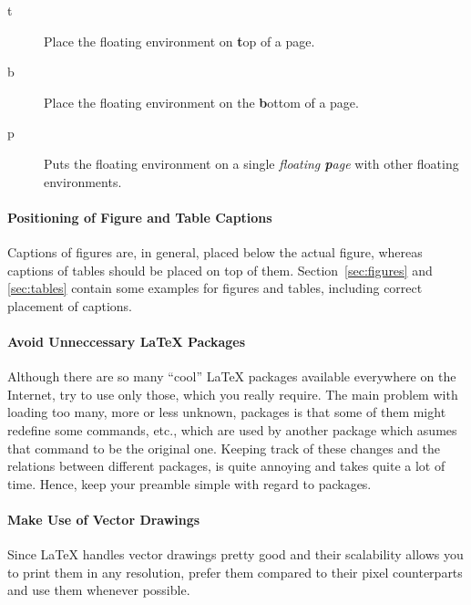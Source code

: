 \begin{description}
\item[t] Place the floating environment on \textbf{t}op of a page.
\item[b] Place the floating environment on the \textbf{b}ottom of a
  page.
\item[p] Puts the floating environment on a single \textit{floating
    \textbf{p}age} with other floating environments.
\end{description}


\paragraph{Positioning of Figure and Table Captions}
Captions of figures are, in general, placed below the actual figure,
whereas captions of tables should be placed on top of
them. Section~\ref{sec:figures} and \ref{sec:tables} contain some
examples for figures and tables, including correct placement of
captions.


\paragraph{Avoid Unneccessary \LaTeX{} Packages}
Although there are so many ``cool'' \LaTeX{} packages available
everywhere on the Internet, try to use only those, which you really
require. The main problem with loading too many, more or less unknown,
packages is that some of them might redefine some commands, etc.,
which are used by another package which asumes that command to be the
original one. Keeping track of these changes and the relations between
different packages, is quite annoying and takes quite a lot of
time. Hence, keep your preamble simple with regard to packages.


\paragraph{Make Use of Vector Drawings}
Since \LaTeX{} handles vector drawings pretty good and their
scalability allows you to print them in any resolution, prefer them
compared to their pixel counterparts and use them whenever possible.



